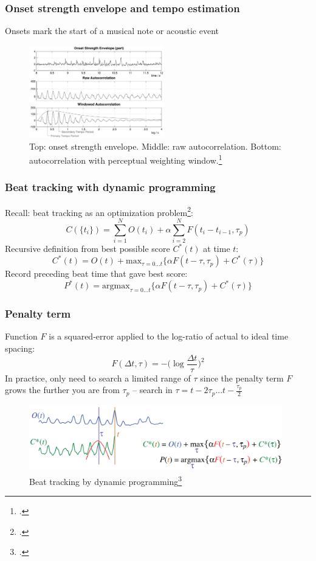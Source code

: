 \documentclass{beamer}
\begin{document}
\begin{frame}
	\frametitle{Onset strength envelope and tempo estimation}
	Onsets mark the start of a musical note or acoustic event
	\begin{figure}
		\includegraphics[height=4cm]{./onset2.png}
		\caption{Top: onset strength envelope. Middle: raw autocorrelation. Bottom: autocorrelation with perceptual weighting window.\footcite{ellis}}
	\end{figure}
\end{frame}


\begin{frame}
	\frametitle{Beat tracking with dynamic programming}
	Recall: beat tracking as an optimization problem\footcite{ellis}:
	\[ C(\{t_{i}\}) = \sum_{i=1}^{N}O(t_{i}) + \alpha\sum_{i=2}^{N}F(t_{i}-t_{i-1}, \tau_{p}) \]
	Recursive definition from best possible score $C^{*}(t)$ at time $t$:
	\[ C^{*}(t) = O(t) + \text{max}_{\tau = 0...t}\{\alpha F(t-\tau, \tau_{p}) + C^{*}(\tau)\} \]
	Record preceding beat time that gave best score:
	\[ P^{*}(t) = \text{argmax}_{\tau = 0...t} \{\alpha F(t-\tau, \tau_{p}) + C^{*}(\tau)\} \]
\end{frame}

\begin{frame}
	\frametitle{Penalty term}
	Function $F$ is a squared-error applied to the log-ratio of actual to ideal time spacing:
	\[ F(\Delta t, \tau) = -\Big(\log\frac{\Delta t}{\tau}\Big)^{2} \]
	In practice, only need to search a limited range of $\tau$ since the penalty term $F$ grows the further you are from $\tau_{p}$ -- search in $\tau = t - 2\tau_{p} ... t - \frac{\tau_{p}}{2}$
	\begin{figure}
		\includegraphics[width=11cm]{./ellisdp.png}
		\caption{Beat tracking by dynamic programming\footcite{ellis2}}
	\end{figure}
\end{frame}
\end{document}
